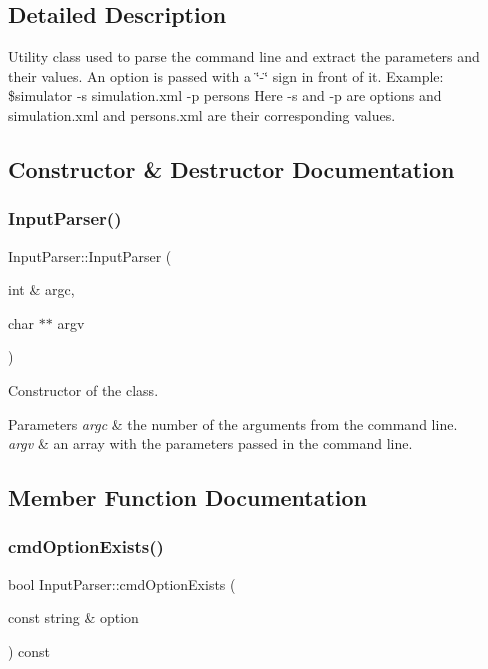 \subsection{Detailed Description}
Utility class used to parse the command line and extract the parameters and their values. An option is passed with a \char`\"{}-\/\char`\"{} sign in front of it. Example\+: \$simulator -\/s simulation.\+xml -\/p persons Here -\/s and -\/p are options and simulation.\+xml and persons.\+xml are their corresponding values. 

\subsection{Constructor \& Destructor Documentation}
\mbox{\label{class_input_parser_af9fa5ead1f28b5294a713410df5b9531}} 
\subsubsection{\texorpdfstring{InputParser()}{InputParser()}}
{\footnotesize\ttfamily Input\+Parser\+::\+Input\+Parser (\begin{DoxyParamCaption}\item[{int \&}]{argc,  }\item[{char $\ast$$\ast$}]{argv }\end{DoxyParamCaption})}

Constructor of the class. 
\begin{DoxyParams}{Parameters}
{\em argc} & the number of the arguments from the command line. \\
\hline
{\em argv} & an array with the parameters passed in the command line. \\
\hline
\end{DoxyParams}


\subsection{Member Function Documentation}
\mbox{\label{class_input_parser_ad3d06a9c59e91f425295bdc8408e0544}} 
\subsubsection{\texorpdfstring{cmdOptionExists()}{cmdOptionExists()}}
{\footnotesize\ttfamily bool Input\+Parser\+::cmd\+Option\+Exists (\begin{DoxyParamCaption}\item[{const string \&}]{option }\end{DoxyParamCaption}) const}


